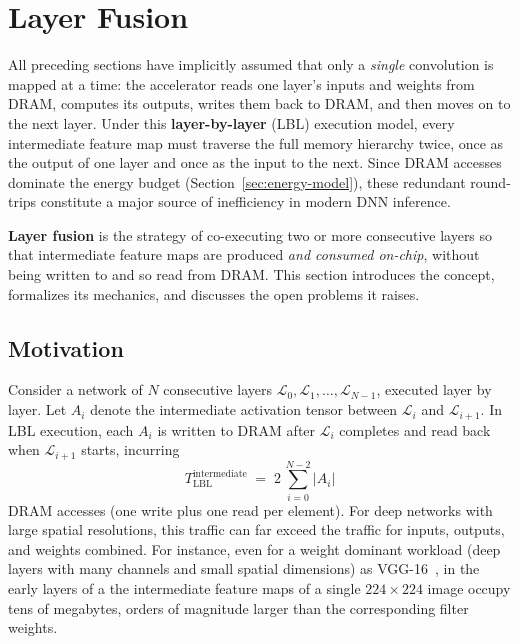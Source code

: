 \section{Layer Fusion}
\label{sec:bg-layer-fusion}

All preceding sections have implicitly assumed that only a
\emph{single} convolution is mapped at a time: the
accelerator reads one layer's inputs and weights from DRAM, computes
its outputs, writes them back to DRAM, and then moves on to the next
layer.
Under this \textbf{layer-by-layer} (LBL) execution model, every
intermediate feature map must traverse the full memory hierarchy twice, once
as the output of one layer and once as the input to the next.
Since DRAM accesses dominate the energy budget
(Section~\ref{sec:energy-model}), these redundant round-trips constitute a
major source of inefficiency in modern DNN inference.

\textbf{Layer fusion} is the strategy of co-executing two or more
consecutive layers so that intermediate feature maps are produced
\emph{and consumed on-chip}, without being written to and so read from DRAM.
This section introduces the concept, formalizes its mechanics, and
discusses the open problems it raises.

\subsection{Motivation}
\label{sec:fusion-motivation}

Consider a network of $N$ consecutive layers
$\mathcal{L}_0, \mathcal{L}_1, \dots, \mathcal{L}_{N-1}$, executed layer by
layer.  Let $A_i$ denote the intermediate activation tensor between
$\mathcal{L}_i$ and $\mathcal{L}_{i+1}$.
In LBL execution, each $A_i$ is written to DRAM after
$\mathcal{L}_i$ completes and read back when $\mathcal{L}_{i+1}$
starts, incurring
\begin{equation}
\label{eq:lbl-traffic}
T_{\text{LBL}}^{\text{intermediate}}
  \;=\; 2\,\sum_{i=0}^{N-2} |A_i|
\end{equation}
DRAM accesses (one write plus one read per element).  For deep networks with
large spatial resolutions, this traffic can far exceed the traffic for inputs,
outputs, and weights combined.  For instance, even for a weight dominant workload (deep layers with
        many channels and small spatial dimensions) as VGG-16~\cite{vgg16},  in the early layers of a the intermediate feature maps of a single
$224\!\times\!224$ image occupy tens of megabytes, orders of magnitude
larger than the corresponding filter weights.

